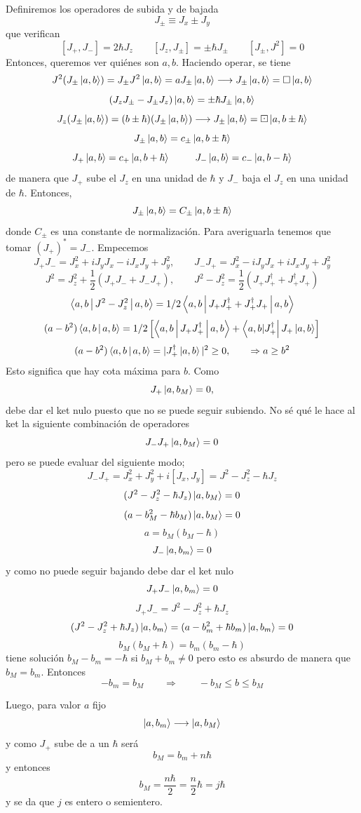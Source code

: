 \documentclass[10pt,oneside]{CBFT_book}
\begin{document}
Definiremos los operadores de subida y de bajada
\[
	J_{\pm} \equiv J_x \pm J_y
\]
que verifican 
\[
	[ J_+, J_- ] = 2\hbar J_z \qquad [ J_z, J_\pm]= \pm \hbar J_{\pm} \qquad [J_{\pm}, J^2 ] = 0
\]
Entonces, queremos ver quiénes son $a, b$. Haciendo operar, se tiene
\[
	J^2( J_\pm \Ket{a,b}) = J_\pm J^2 \Ket{a,b} = a J_\pm \Ket{a,b} \longrightarrow 
		J_\pm \Ket{a,b} = \Box \Ket{a,b}
\]
\[
	(J_zJ_\pm - J_\pm J_z) \Ket{a,b} = \pm\hbar J_\pm \Ket{a,b}
\]
\[
	J_z (J_\pm \Ket{a,b}) = (b\pm\hbar)(J_\pm \Ket{a,b}) \longrightarrow 
		J_\pm \Ket{a,b} = \boxdot \Ket{a,b\pm\hbar}
\]
\[
	J_{\pm} \Ket{a,b} = c_{\pm} \Ket{a,b\pm\hbar}
\]
\[
	J_+\Ket{a,b} = c_+\Ket{a,b+\hbar} \;\qquad\; J_-\Ket{a,b} =  c_- \Ket{a,b-\hbar}
\]
de manera que $J_+$ sube el $J_z$ en una unidad de $\hbar$ y $J_-$ baja el $J_z$ en una unidad de $\hbar$.
Entonces,
\[
	J_\pm \Ket{a,b} = C_\pm \Ket{a,b\pm\hbar}
\]
donde $C_\pm$ es una constante de normalización. Para averiguarla tenemos que tomar $(J_+)^* = J_-$.
Empecemos
\[
	J_+J_- = J_x^2 + iJ_yJ_x - iJ_xJ_y + J_y^2 , \qquad J_-J_+ = J_x^2 - iJ_yJ_x + iJ_xJ_y + J_y^2
\]
\[
	J^2 = J_z^2 + \frac{1}{2}(J_+J_- + J_-J_+ ) , \qquad 
		J^2 - J_z^2 = \frac{1}{2}(J_+J_+^\dagger + J_+^\dagger J_+ )
\]
\[
	\Braket{a,b|J^2 - J^2_z|a,b} =  1/2 \Braket{a,b|J_+J_+^\dagger + J_+^\dagger J_+|a,b}
\]
\[
	(a-b^2)\Braket{a,b|a,b} = 1/2 \left[ \Braket{a,b|J_+J_+^\dagger|a,b} + 
		\Bra{a,b|J_+^\dagger} J_+\Ket{a,b} \right] 
\]
\[
	(a-b^2)\Braket{a,b|a,b} = |J_+^\dagger\Ket{a,b}|^2 \geq 0, \qquad \Rightarrow a \geq b^2
\]
Esto significa que hay cota máxima para $b$.
Como 
\[
	J_+ \Ket{a,b_M} = 0,
\]
debe dar el ket nulo puesto que no se puede seguir subiendo. No sé qué le hace al ket la
siguiente combinación de operadores
\[
	J_-J_+ \Ket{a,b_M} = 0
\]
pero se puede evaluar del siguiente modo;
\[
	J_-J_+ = J^2_x + J^2_y + i[J_x, J_y]  = J^2 - J^2_z - \hbar J_z
\]
\[
	( J^2 - J^2_z  -\hbar J_z) \Ket{a,b_M}  = 0	
\]
\[
	( a - b_M^2 - \hbar b_M ) \Ket{a,b_M}  = 0	
\]
\[
	a = b_M ( b_M -\hbar )
\]
\[
	J_- \Ket{a,b_m} = 0
\]
y como no puede seguir bajando debe dar el ket nulo
\[
	J_+J_- \Ket{a,b_m} = 0
\]
\[
	J_+J_- =  J^2 - J^2_z + \hbar J_z
\]
\[
	( J^2 - J^2_z + \hbar J_z) \Ket{a,b_m} = ( a - b_m^2 + \hbar b_m) \Ket{a,b_m} = 0
\]
\[
	b_M( b_M + \hbar ) = b_m( b_m -\hbar )
\]
tiene solución $b_M-b_m = -\hbar$ si $b_M + b_m \neq 0$ 
pero esto es absurdo de manera que $b_M = b_m$.
Entonces
\[
	-b_m = b_M  \qquad \Rightarrow \qquad -b_M \leq b \leq b_M
\]

Luego, para valor $a$ fijo 
\[
	\Ket{a,b_m} \longrightarrow \Ket{a,b_M}
\]
y como $J_+$ sube de a un $\hbar$ será
\[
	b_M = b_m + n\hbar
\]
y entonces
\[
	b_M = \frac{n\hbar}{2} = \frac{n}{2} \hbar = j \hbar
\]
y se da que $j$ es entero o semientero.
\end{document}
